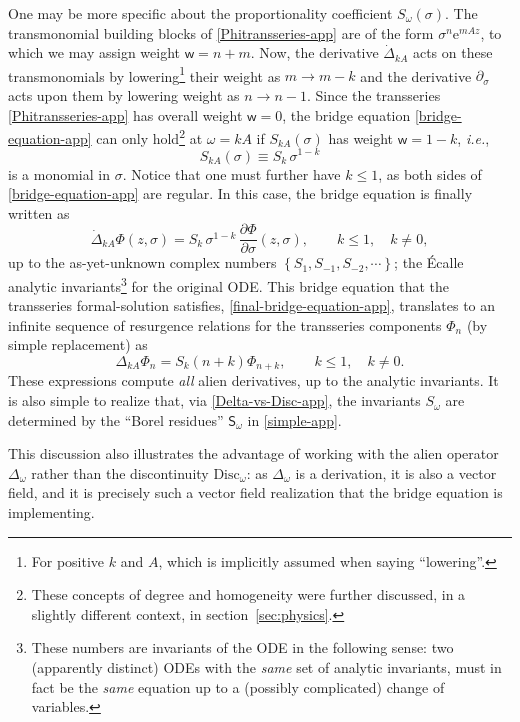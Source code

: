 \documentclass[11pt,a4paper]{article}
\newcommand{\be}{\begin{equation}}
\newcommand{\ee}{\end{equation}}
\def\disc{{\mathrm{Disc}}}
\newcommand{\rme}{{\mathrm{e}}}
\begin{document}
One may be more specific about the proportionality coefficient $S_\omega(\sigma)$. The transmonomial building blocks of \eqref{Phitransseries-app} are of the form $\sigma^n \rme^{m A z}$, to which we may assign weight $\mathsf{w} = n+m$. Now, the derivative $\dot{\Delta}_{k A}$ acts on these transmonomials by lowering\footnote{For positive $k$ and $A$, which is implicitly assumed when saying ``lowering''.} their weight as $m \to m-k$ and the derivative $\partial_\sigma$ acts upon them by lowering weight as $n \to n-1$. Since the transseries \eqref{Phitransseries-app} has overall weight $\mathsf{w}=0$, the bridge equation \eqref{bridge-equation-app} can only hold\footnote{These concepts of degree and homogeneity were further discussed, in a slightly different context, in section~\ref{sec:physics}.} at $\omega = k A$ if $S_{k A} (\sigma)$ has weight $\mathsf{w} = 1-k$, \textit{i.e.},
%
\be
S_{k A} (\sigma) \equiv S_k\, \sigma^{1-k}
\ee
%
\noindent
is a monomial in $\sigma$. Notice that one must further have $k\leq1$, as both sides of \eqref{bridge-equation-app} are regular. In this case, the bridge equation is finally written as
%
\be
\label{final-bridge-equation-app}
\dot{\Delta}_{k A} \Phi (z,\sigma) = S_k\, \sigma^{1-k}\, \frac{\partial\Phi}{\partial\sigma} (z,\sigma), \qquad k \leq 1, \quad k \neq 0,
\ee
%
\noindent
up to the as-yet-unknown complex numbers $\left\{ S_{1}, S_{-1}, S_{-2}, \cdots \right\}$; the \'Ecalle analytic invariants\footnote{These numbers are invariants of the ODE in the following sense: two (apparently distinct) ODEs with the \textit{same} set of analytic invariants, must in fact be the \textit{same} equation up to a (possibly complicated) change of variables.} for the original ODE. This bridge equation that the transseries formal-solution satisfies, \eqref{final-bridge-equation-app}, translates to an infinite sequence of resurgence relations for the transseries components $\Phi_n$ (by simple replacement) as
%
\be
\label{bridge-app}
\Delta_{k A} \Phi_n = S_k \left( n+k \right) \Phi_{n+k}, \qquad k \leq 1, \quad k \neq 0.
\ee
%
\noindent
These expressions compute \textit{all} alien derivatives, up to the analytic invariants. It is also simple to realize that, via \eqref{Delta-vs-Disc-app}, the invariants $S_\omega$ are determined by the ``Borel residues'' $\mathsf{S}_\omega$ in \eqref{simple-app}.

This discussion also illustrates the advantage of working with the alien operator $\Delta_\omega$ rather than the discontinuity $\disc_\omega$: as $\Delta_\omega$ is a derivation, it is also a vector field, and it is precisely such a vector field realization that the bridge equation is implementing.
\end{document}
